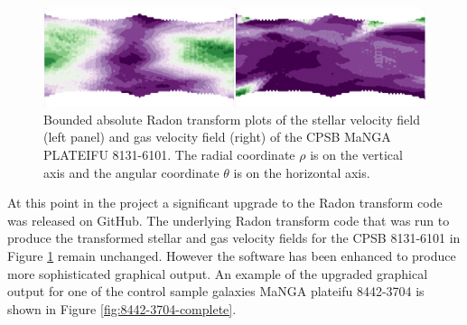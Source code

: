 \begin{figure}
    \centering
   	\includegraphics[width=\columnwidth]{images/RadonPlots/RT-snips/CPSB-8313-6101-RT-snip.png}
    \caption[Example of basic Radon transform plots for the gas and velocity fields of CPSB 8131-6101]{Bounded absolute Radon transform plots of the stellar velocity field (left panel) and gas velocity field (right) of the CPSB MaNGA PLATEIFU 8131-6101. The radial coordinate $\rho$ is on the vertical axis and the angular coordinate $\theta$ is on the horizontal axis.}
    \label{fig:RT_8131-6101}
\end{figure}


At this point in the project a significant upgrade to the Radon transform code was released on GitHub. The underlying Radon transform code that was run to produce the transformed stellar and gas velocity fields for the CPSB 8131-6101 in Figure \ref{fig:RT_8131-6101} remain unchanged. However the software has been enhanced to produce more sophisticated graphical output. An example of the upgraded graphical output for one of the control sample galaxies MaNGA plateifu 8442-3704 is shown in Figure \ref{fig:8442-3704-complete}.

